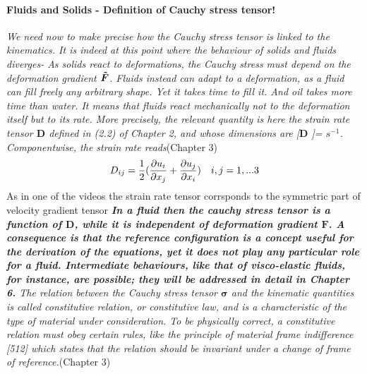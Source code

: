 \documentclass[11pt,letterpaper]{article}
\begin{document}
\paragraph{Fluids and Solids - Definition of Cauchy stress tensor!} \textit{We need now to make precise how the Cauchy stress tensor is linked to the kinematics. It is indeed at this point where the behaviour of solids and fluids diverges- As solids react to deformations, the Cauchy stress must depend on the deformation gradient $\bm{\Tilde{F}}$. 
Fluids instead can adapt to a deformation, as a fluid can fill freely any
arbitrary shape. Yet it takes time to fill it. And oil takes more time than water. It means that fluids react mechanically not to the deformation itself but to its rate. More precisely, the relevant quantity is here the strain rate tensor $\bm{D}$ defined in (2.2) of Chapter 2, and whose dimensions are [$\bm{D}$ ]= $s^{-1}$. Componentwise, the strain rate reads}(Chapter 3) 
\begin{equation}
    D_{ij} = \frac{1}{2} \large( \frac{\partial u_i}{\partial x_j} + \frac{\partial u_j}{\partial x_i} \large) \hspace{10pt} i,j=1,...3
\end{equation}
As in one of the videos the strain rate tensor corrsponds to the symmetric part of velocity gradient tensor
\textit{\textbf{In a fluid then  the cauchy stress tensor is a function of $\bm{D}$, while it is independent of  deformation gradient $\bm{F}$. A consequence is that the reference configuration is a concept useful for the derivation of the equations, yet it does not play any particular role for a fluid. Intermediate behaviours, like that of visco-elastic fluids, for instance, are possible; they will be addressed in detail in Chapter 6.} The relation between the Cauchy stress tensor $\bm{\sigma}$ and the kinematic quantities is called constitutive relation, or constitutive law, and is a characteristic of the type of material under consideration. To be physically correct, a constitutive relation must obey certain rules, like the principle of material frame indifference [512] which states that the relation should be invariant under a change of frame of reference.}(Chapter 3)
\end{document}
